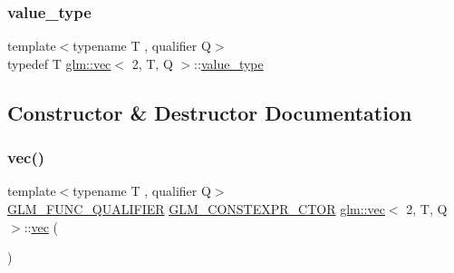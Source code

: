 \mbox{\label{structglm_1_1vec_3_012_00_01_t_00_01_q_01_4_ab44999b08d6a5e2c26e7708ada237759}} 
\subsubsection{\texorpdfstring{value\+\_\+type}{value\_type}}
{\footnotesize\ttfamily template$<$typename T , qualifier Q$>$ \\
typedef T \mbox{\hyperlink{structglm_1_1vec}{glm\+::vec}}$<$ 2, T, Q $>$\+::\mbox{\hyperlink{structglm_1_1vec_3_012_00_01_t_00_01_q_01_4_ab44999b08d6a5e2c26e7708ada237759}{value\+\_\+type}}}



\subsection{Constructor \& Destructor Documentation}
\mbox{\label{structglm_1_1vec_3_012_00_01_t_00_01_q_01_4_a5f9f2f93b75d46552dc284dcbc1bb2d5}} 
\subsubsection{\texorpdfstring{vec()}{vec()}\hspace{0.1cm}{\footnotesize\ttfamily [1/17]}}
{\footnotesize\ttfamily template$<$typename T , qualifier Q$>$ \\
\mbox{\hyperlink{setup_8hpp_a33fdea6f91c5f834105f7415e2a64407}{G\+L\+M\+\_\+\+F\+U\+N\+C\+\_\+\+Q\+U\+A\+L\+I\+F\+I\+ER}} \mbox{\hyperlink{setup_8hpp_ad34178a09666081abdb573c14d1f4a5a}{G\+L\+M\+\_\+\+C\+O\+N\+S\+T\+E\+X\+P\+R\+\_\+\+C\+T\+OR}} \mbox{\hyperlink{structglm_1_1vec}{glm\+::vec}}$<$ 2, T, Q $>$\+::\mbox{\hyperlink{structglm_1_1vec}{vec}} (\begin{DoxyParamCaption}{ }\end{DoxyParamCaption})}

\mbox{\label{structglm_1_1vec_3_012_00_01_t_00_01_q_01_4_ad1785b216e3d6fa5f833c4cd58863cc4}} 
